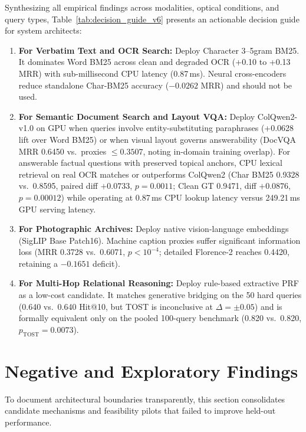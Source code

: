 Synthesizing all empirical findings across modalities, optical conditions, and query types, Table~\ref{tab:decision_guide_v6} presents an actionable decision guide for system architects:
\begin{enumerate}
    \setlength{\itemsep}{0.2pt plus 0.1pt}
    \setlength{\parskip}{0pt}
    \item \textbf{For Verbatim Text and OCR Search:} Deploy Character 3--5gram BM25. It dominates Word BM25 across clean and degraded OCR (+0.10 to +0.13 MRR) with sub-millisecond CPU latency (0.87\,ms). Neural cross-encoders reduce standalone Char-BM25 accuracy ($-0.0262$ MRR) and should not be used.
    \item \textbf{For Semantic Document Search and Layout VQA:} Deploy ColQwen2-v1.0 on GPU when queries involve entity-substituting paraphrases (+0.0628 lift over Word BM25) or when visual layout governs answerability (DocVQA MRR 0.6450 vs.\ proxies $\le 0.3507$, noting in-domain training overlap). For answerable factual questions with preserved topical anchors, CPU lexical retrieval on real OCR matches or outperforms ColQwen2 (Char BM25 0.9328 vs.\ 0.8595, paired diff $+0.0733$, $p = 0.0011$; Clean GT 0.9471, diff $+0.0876$, $p=0.00012$) while operating at 0.87\,ms CPU lookup latency versus 249.21\,ms GPU serving latency.
    \item \textbf{For Photographic Archives:} Deploy native vision-language embeddings (SigLIP Base Patch16). Machine caption proxies suffer significant information loss (MRR 0.3728 vs.\ 0.6071, $p < 10^{-4}$; detailed Florence-2 reaches 0.4420, retaining a $-0.1651$ deficit).
    \item \textbf{For Multi-Hop Relational Reasoning:} Deploy rule-based extractive PRF as a low-cost candidate. It matches generative bridging on the 50 hard queries (0.640 vs.\ 0.640 Hit@10, but TOST is inconclusive at $\Delta=\pm0.05$) and is formally equivalent only on the pooled 100-query benchmark (0.820 vs.\ 0.820, $p_{\text{TOST}}=0.0073$).
\end{enumerate}

\section{Negative and Exploratory Findings}
\label{sec:negative_findings}

To document architectural boundaries transparently, this section consolidates candidate mechanisms and feasibility pilots that failed to improve held-out performance.

